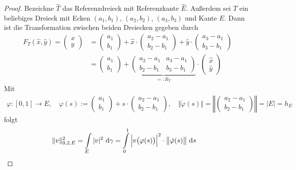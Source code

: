 \begin{proof}
Bezeichne $\hat{T}$ das Referenzdreieck mit Referenzkante $\hat{E}$. Außerdem sei $T$ ein beliebiges Dreieck mit Ecken $(a_1,b_1)$, $(a_2,b_2)$, $(a_3,b_3)$ und Kante $E$.
Dann ist die Transformation zwischen beiden Dreiecken gegeben durch
\begin{align*}
F_T(\hat{x},\hat{y})=\begin{pmatrix}
x\\y
\end{pmatrix}
&=\begin{pmatrix}
a_1\\ b_1
\end{pmatrix}
+\hat{x}\cdot\begin{pmatrix}
a_2-a_1\\ b_2-b_1
\end{pmatrix}+
\hat{y}\cdot\begin{pmatrix}
a_3-a_1\\ b_3-b_1
\end{pmatrix}\\
&=\begin{pmatrix}
a_1\\ b_1
\end{pmatrix}
+\underbrace{\begin{pmatrix}
a_2-a_1 & a_3-a_1\\
b_2-b_1 & b_3-b_1
\end{pmatrix}}_{=:B_T}\cdot\begin{pmatrix}
\hat{x}\\ \hat{y}
\end{pmatrix}
\end{align*}
Mit
\begin{align*}
\varphi\colon[0,1]\to E,\quad\varphi(s):=\begin{pmatrix}
a_1\\ b_1
\end{pmatrix}+s\cdot\begin{pmatrix}
a_2-a_1\\
b_2-b_1
\end{pmatrix},\quad
\big\Vert\dot\varphi(s)\big\Vert=\left\Vert\begin{pmatrix}
a_2-a_1\\
b_2-b_1
\end{pmatrix}\right\Vert=|E|=h_E
\end{align*}
folgt
\begin{align*}
&\Vert v\Vert_{0,2,E}^2
=\int\limits_E|v|^2\d\gamma
=\int\limits_0^1\Big|v\big(\varphi(s)\big)\Big|^2\cdot\big\Vert\dot{\varphi}(s)\big\Vert\d s

\end{align*}
\end{proof}
